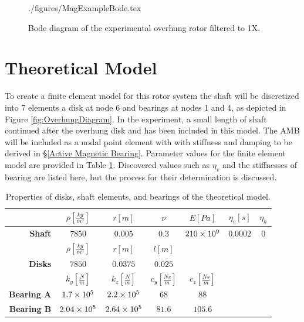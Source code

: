 \begin{figure}[!htb]
	\def\width{.7\linewidth}
	\def\height{.4\linewidth}
	\def\sep{3em}
	\centering
	{./figures/MagExampleBode.tex}
	\caption{Bode diagram of the experimental overhung rotor filtered to 1X.}
	\label{fig:MagExampleBode}
\end{figure}
\section{Theoretical Model}
To create a finite element model for this rotor system the shaft will be discretized into 7 elements a disk at node 6 and bearings at nodes 1 and 4, as depicted in Figure \ref{fig:OverhungDiagram}. In the experiment, a small length of shaft continued after the overhung disk and has been included in this model. The AMB will be included as a nodal point element with with stiffness and damping to be derived in \S\ref{Active Magnetic Bearing}. Parameter values for the finite element model are provided in Table \ref{tab:OverhungParameters}. Discovered values such as $ \eta_v $ and the stiffnesses of bearing are listed here, but the process for their determination is discussed.
\begin{table}
	\caption{Properties of disks, shaft elements, and bearings of the theoretical model.} \label{tab:MagTheoryRotorTable}
	\centering
	\label{tab:OverhungParameters}
	\begin{tabular}{rcccccc}
							&$\rho\left[\frac{kg}{m^3}\right]$	&$r[m]$					&$\nu$				&$E[Pa]$			&$ \eta_v[s] $	&$ \eta_h $	\\\hline
		\textbf{Shaft}		&$7850$					&$0.005$				&$0.3$				&$\num{210E9}$		&$ 0.0002 $		&$ 0 $		\\[-.2em]
							&$\rho\left[\frac{kg}{m^3}\right]$	&$r[m]$					&$l[m]$				&					&				&			\\\hline
		\textbf{Disks}		&$7850$					&$0.0375$				&$0.025$			&					&				&			\\[-.2em]
							&$k_y\left[\frac{N}{m}\right]$		&$k_z\left[\frac{N}{m}\right]$		&$c_y\left[\frac{Ns}{m}\right]$&$c_z\left[\frac{Ns}{m}\right]$&				&			\\\hline
		\textbf{Bearing A}	&$1.7\times 10^{5}$				&$2.2\times 10^{5}$				&$68$				&$88$				&				&			\\[-.5em]
		\textbf{Bearing B}	&$2.04\times 10^{5}$			&$2.64\times 10^{5}$			&$81.6$				&$105.6$			&				&			\\
	\end{tabular}
\end{table}
